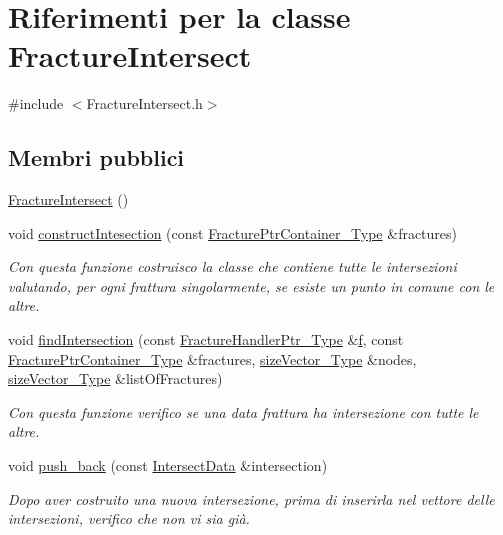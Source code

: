 \hypertarget{classFractureIntersect}{\section{Riferimenti per la classe Fracture\-Intersect}
\label{classFractureIntersect}
}


{\ttfamily \#include $<$Fracture\-Intersect.\-h$>$}

\subsection*{Membri pubblici}
\begin{DoxyCompactItemize}
\item 
\hyperlink{classFractureIntersect_a2416c29105bde5cbf9032b04db47ba31}{Fracture\-Intersect} ()
\item 
void \hyperlink{classFractureIntersect_a192d02d60bcab84e6ab2765c8167f614}{construct\-Intesection} (const \hyperlink{FractureHandler_8h_a2f0b57e18ecf89912d7de0c87158009e}{Fracture\-Ptr\-Container\-\_\-\-Type} \&fractures)
\begin{DoxyCompactList}\small\item\em Con questa funzione costruisco la classe che contiene tutte le intersezioni valutando, per ogni frattura singolarmente, se esiste un punto in comune con le altre. \end{DoxyCompactList}\item 
void \hyperlink{classFractureIntersect_a63e99fbb20ef4804cbf99d8f1ab19ac6}{find\-Intersection} (const \hyperlink{FractureHandler_8h_af23fb7a30aaff864bd42587af4f1e78a}{Fracture\-Handler\-Ptr\-\_\-\-Type} \&\hyperlink{god__e_8m_a8ea372f7ee3c01d11fc4b4d13b8e6a75}{f}, const \hyperlink{FractureHandler_8h_a2f0b57e18ecf89912d7de0c87158009e}{Fracture\-Ptr\-Container\-\_\-\-Type} \&fractures, \hyperlink{Core_8h_a83c51913d041a5001e8683434c09857f}{size\-Vector\-\_\-\-Type} \&nodes, \hyperlink{Core_8h_a83c51913d041a5001e8683434c09857f}{size\-Vector\-\_\-\-Type} \&list\-Of\-Fractures)
\begin{DoxyCompactList}\small\item\em Con questa funzione verifico se una data frattura ha intersezione con tutte le altre. \end{DoxyCompactList}\item 
void \hyperlink{classFractureIntersect_a01bc187a846208a47a13daeeb94b13f5}{push\-\_\-back} (const \hyperlink{classIntersectData}{Intersect\-Data} \&intersection)
\begin{DoxyCompactList}\small\item\em Dopo aver costruito una nuova intersezione, prima di inserirla nel vettore delle intersezioni, verifico che non vi sia già. \end{DoxyCompactList}\item 

\end{DoxyCompactItemize}
